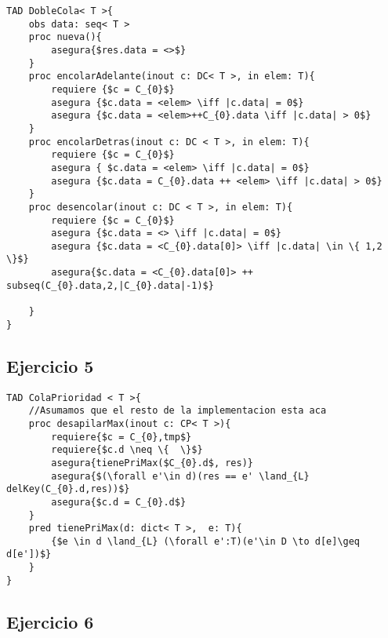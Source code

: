 \documentclass[6pt]{article}
\begin{document}
\begin{lstlisting}
TAD DobleCola< T >{
    obs data: seq< T >
    proc nueva(){
        asegura{$res.data = <>$}
    }
    proc encolarAdelante(inout c: DC< T >, in elem: T){
        requiere {$c = C_{0}$}
        asegura {$c.data = <elem> \iff |c.data| = 0$}
        asegura {$c.data = <elem>++C_{0}.data \iff |c.data| > 0$}
    }
    proc encolarDetras(inout c: DC < T >, in elem: T){
        requiere {$c = C_{0}$}
        asegura { $c.data = <elem> \iff |c.data| = 0$}
        asegura {$c.data = C_{0}.data ++ <elem> \iff |c.data| > 0$}
    }
    proc desencolar(inout c: DC < T >, in elem: T){
        requiere {$c = C_{0}$}
        asegura {$c.data = <> \iff |c.data| = 0$}
        asegura {$c.data = <C_{0}.data[0]> \iff |c.data| \in \{ 1,2 \}$}
        asegura{$c.data = <C_{0}.data[0]> ++ subseq(C_{0}.data,2,|C_{0}.data|-1)$}
        
    }
}
\end{lstlisting}

\subsection*{Ejercicio 5}

\begin{lstlisting}
TAD ColaPrioridad < T >{
    //Asumamos que el resto de la implementacion esta aca
	proc desapilarMax(inout c: CP< T >){
		requiere{$c = C_{0},tmp$}
		requiere{$c.d \neq \{  \}$}
		asegura{tienePriMax($C_{0}.d$, res)}
		asegura{$(\forall e'\in d)(res == e' \land_{L} delKey(C_{0}.d,res))$}
		asegura{$c.d = C_{0}.d$}
	}
	pred tienePriMax(d: dict< T >,  e: T){
		{$e \in d \land_{L} (\forall e':T)(e'\in D \to d[e]\geq d[e'])$}
	}
}
\end{lstlisting}

\newpage
\subsection*{Ejercicio 6}
\end{document}
